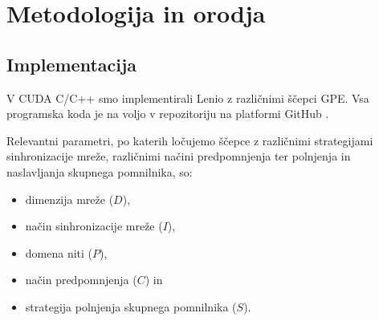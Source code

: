 \documentclass[a4paper, 12pt, openright]{book}
\begin{document}

\chapter{Metodologija in orodja}
\label{metodologija}

\section{Implementacija}

V CUDA C/C++ smo implementirali Lenio z različnimi ščepci GPE.
Vsa programska koda je na voljo v repozitoriju na platformi GitHub \cite{repo}.

Relevantni parametri, po katerih ločujemo ščepce z različnimi strategijami sinhronizacije mreže, različnimi načini predpomnjenja ter polnjenja in naslavljanja skupnega pomnilnika, so:
\begin{itemize}
    \item dimenzija mreže (\(D\)),
    \item način sinhronizacije mreže (\(I\)),
    \item domena niti (\(P\)),
    \item način predpomnjenja (\(C\)) in
    \item strategija polnjenja skupnega pomnilnika (\(S\)).
\end{itemize}
\end{document}

